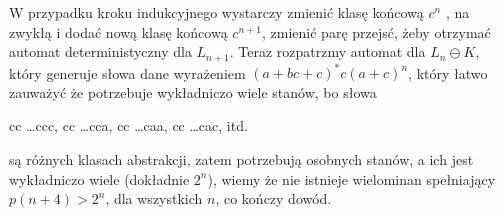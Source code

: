\documentclass[11pt]{scrartcl}
\begin{document}
\begin{walk}
          W przypadku kroku indukcyjnego wystarczy zmienić klasę końcową $c^n$ , na zwykłą i dodać nową klasę końcową $c^{n+1}$, zmienić parę przejsć, żeby otrzymać automat deterministyczny dla $L_{n+1}$. 
          Teraz rozpatrzmy automat dla $L_n \ominus K$, który generuje słowa dane wyrażeniem $(a+bc+c)^*c(a+c)^n$, który łatwo zauważyć że potrzebuje wykładniczo wiele stanów, bo słowa
          \begin{center}
              cc \dots ccc, cc \dots cca, cc \dots caa, cc \dots cac, itd.
          \end{center}
          są różnych klasach abstrakcji, zatem potrzebują osobnych stanów, a ich jest wykładniczo wiele (dokładnie $2^n$), wiemy że nie istnieje wielominan spełniający $p(n+4) > 2^n$, dla wszystkich $n$, co kończy dowód.
    \end{walk}
    
    
    
\end{document}
